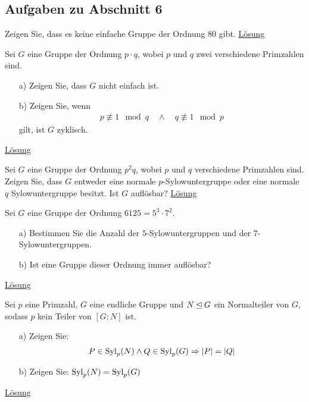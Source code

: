 \subsection{Aufgaben zu Abschnitt 6}

\begin{exe}\label{aufgabe:6.1}
	Zeigen Sie, dass es keine einfache Gruppe der Ordnung $ 80  $ gibt.
	\hyperlink{loes:6.1}{Lösung}
\end{exe}

\begin{exe}\label{aufgabe:6.2}
	Sei $ G $ eine Gruppe der Ordnung $ p \cdot q $, wobei $ p $ und $ q $
	zwei verschiedene Primzahlen sind.
	\begin{enumerate}
		\item[a)]
		Zeigen Sie, dass $ G $ nicht einfach ist.
		
		\item[b)]
		 Zeigen Sie, wenn
		 \begin{align*}
		 p \not\equiv 1 \mod q \quad 
		 \wedge
		 \quad q \not\equiv 1 \mod p
		 \end{align*}
		 gilt, ist $ G $ zyklisch.
	\end{enumerate}
	\hyperlink{loes:6.2}{Lösung}
\end{exe}

\begin{exe}\label{aufgabe:6.3}
	Sei $ G $ eine Gruppe der Ordnung $ p^2q $, wobei $ p $ und $ q $ verschiedene Primzahlen sind.
	Zeigen Sie, dass $ G $ entweder eine normale $ p $-Sylowuntergruppe oder eine normale $ q $
	Sylowuntergruppe besitzt.
	Ist $ G $ auflösbar?
	\hyperlink{loes:6.3}{Lösung}
\end{exe}

\begin{exe}\label{aufgabe:6.4}
	Sei $ G $ eine Gruppe der Ordnung $ 6125 = 5^3 \cdot 7^2  $.
	\begin{enumerate}
		\item[a)]
		Bestimmen Sie die Anzahl der $ 5 $-Sylowuntergruppen und der $ 7 $-Sylowuntergruppen.
		
		\item[b)] 
		Ist eine Gruppe dieser Ordnung immer auflösbar?		
	\end{enumerate}
	\hyperlink{loes:6.4}{Lösung}
\end{exe}

\begin{exe}
	Sei $ p $ eine Primzahl, $ G $ eine endliche Gruppe und $ N \unlhd G $ ein Normalteiler von $ G $, sodass $ p $ kein Teiler von $ [G:N] $ ist.
	\begin{enumerate}
		\item[a)]
		Zeigen Sie:
		\begin{align*}
		P \in \operatorname{Syl}_p(N) \wedge Q \in \operatorname{Syl}_p(G) 
		\Rightarrow
		 |P | = |Q| 
		\end{align*} 
		
		\item[b)]
		Zeigen Sie:
		$ \operatorname{Syl}_p(N) = \operatorname{Syl}_p(G) $
	\end{enumerate}
	\hyperlink{loes:6.5}{Lösung}
\end{exe}